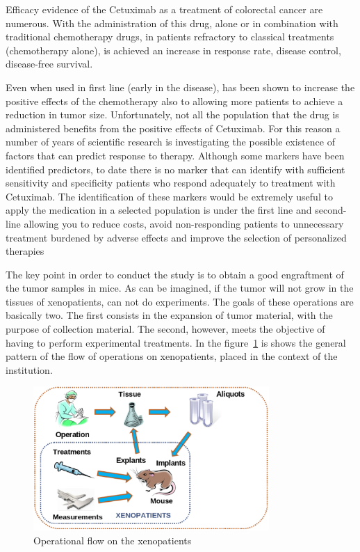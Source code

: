 Efficacy evidence of the Cetuximab as a treatment of colorectal cancer are numerous. With the administration of this drug, alone or in combination with traditional chemotherapy drugs, in patients refractory to classical treatments (chemotherapy alone), is achieved an increase in response rate, disease control, disease-free survival.

Even when used in first line (early in the disease), has been shown to increase the positive effects of the chemotherapy also to allowing more patients to achieve a reduction in tumor size. Unfortunately, not all the population that the drug is administered benefits from the positive effects of Cetuximab. For this reason a number of years of scientific research is investigating the possible existence of factors that can predict response to therapy. Although some markers have been identified predictors, to date there is no marker that can identify with sufficient sensitivity and specificity patients who respond adequately to treatment with Cetuximab. The identification of these markers would be extremely useful to apply the medication in a selected population is under the first line and second-line allowing you to reduce costs, avoid non-responding patients to unnecessary treatment burdened by adverse effects and improve the selection of personalized therapies

The key point in order to conduct the study is to obtain a good engraftment of the tumor samples in mice. As can be imagined, if the tumor will not grow in the tissues of xenopatients, can not do experiments. The goals of these operations are basically two. The first consists in the expansion of tumor material, with the purpose of collection material. The second, however, meets the objective of having to perform experimental treatments.
In the figure~\ref{fig:schema} is shows the general pattern of the flow of operations on xenopatients, placed in the context of the institution. 
\begin{figure}[h]
\begin{center}
\includegraphics[width=0.8\textwidth]{./Figure/schema}
\end{center}
\caption{Operational flow on the xenopatients}\label{fig:schema}
\end{figure}

